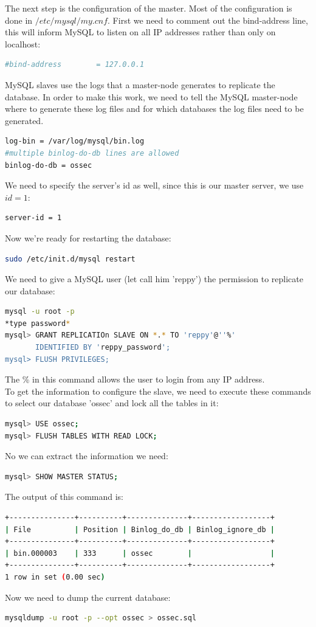 \documentclass[12pt]{report}
\begin{document}
The next step is the configuration of the master. Most of the
configuration is done in $/etc/mysql/my.cnf$.
First we need to comment out the bind-address line, this will inform MySQL
to listen on all IP addresses rather than only on localhost:
\begin{lstlisting}[language=bash]
#bind-address        = 127.0.0.1
\end{lstlisting}
MySQL slaves use the logs that a master-node generates to replicate
the database. In order to make this work, we need to tell the MySQL
master-node where to
generate these log files and for which databases the log files need to
be generated. 
\begin{lstlisting}[language=bash]
log-bin = /var/log/mysql/bin.log
#multiple binlog-do-db lines are allowed
binlog-do-db = ossec
\end{lstlisting}
We need to specify the server's id as well, since this is our master
server, we use $id=1$:
\begin{lstlisting}[language=bash]
server-id = 1
\end{lstlisting}
Now we're ready for restarting the database:
\begin{lstlisting}[language=bash]
sudo /etc/init.d/mysql restart
\end{lstlisting}
We need to give a MySQL user (let call him 'reppy') the permission to replicate our
database:
\begin{lstlisting}[language=bash]
mysql -u root -p
*type password*
mysql> GRANT REPLICATIOn SLAVE ON *.* TO 'reppy'@''%' 
       IDENTIFIED BY 'reppy_password';
mysql> FLUSH PRIVILEGES;
\end{lstlisting}
The \% in this command allows the user to login from any IP address.\\

To get the information to configure the slave, we need to execute these
commands to select our database 'ossec' and lock all the tables in it:
\begin{lstlisting}[language=bash]
mysql> USE ossec;
mysql> FLUSH TABLES WITH READ LOCK;
\end{lstlisting}
No we can extract the information we need:
\begin{lstlisting}[language=bash]
mysql> SHOW MASTER STATUS;
\end{lstlisting}
The output of this command is:
\begin{lstlisting}[language=bash]
+---------------+----------+--------------+------------------+
| File          | Position | Binlog_do_db | Binlog_ignore_db |
+---------------+----------+--------------+------------------+
| bin.000003    | 333      | ossec        |                  |
+---------------+----------+--------------+------------------+
1 row in set (0.00 sec)
\end{lstlisting}
Now we need to dump the current database:
\begin{lstlisting}[language=bash]
mysqldump -u root -p --opt ossec > ossec.sql
\end{lstlisting}
\end{document}
